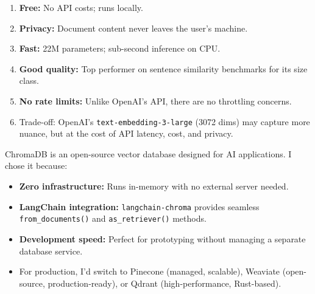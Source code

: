 \documentclass[12pt,a4paper]{article}
\begin{document}
\begin{interviewbox}
\end{interviewbox}
\begin{answerbox}
\begin{enumerate}
  \item \textbf{Free:} No API costs; runs locally.
  \item \textbf{Privacy:} Document content never leaves the user's machine.
  \item \textbf{Fast:} 22M parameters; sub-second inference on CPU.
  \item \textbf{Good quality:} Top performer on sentence similarity benchmarks for its size class.
  \item \textbf{No rate limits:} Unlike OpenAI's API, there are no throttling concerns.
  \item Trade-off: OpenAI's \texttt{text-embedding-3-large} (3072 dims) may capture more nuance, but at the cost of API latency, cost, and privacy.
\end{enumerate}
\end{answerbox}

\begin{interviewbox}
\end{interviewbox}
\begin{answerbox}
ChromaDB is an open-source vector database designed for AI applications. I chose it because:
\begin{itemize}
  \item \textbf{Zero infrastructure:} Runs in-memory with no external server needed.
  \item \textbf{LangChain integration:} \texttt{langchain-chroma} provides seamless \texttt{from\_documents()} and \texttt{as\_retriever()} methods.
  \item \textbf{Development speed:} Perfect for prototyping without managing a separate database service.
  \item For production, I'd switch to Pinecone (managed, scalable), Weaviate (open-source, production-ready), or Qdrant (high-performance, Rust-based).
\end{itemize}
\end{answerbox}
\end{document}
